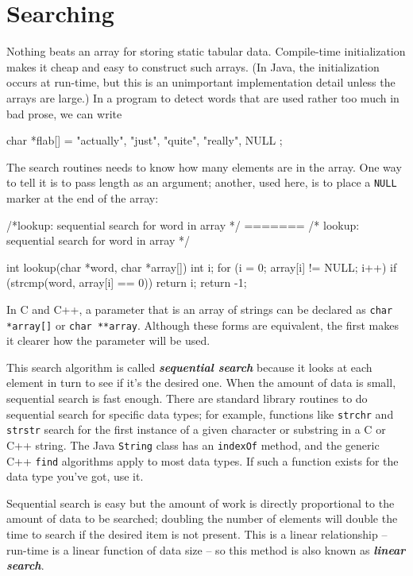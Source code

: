 \section{Searching}
Nothing beats an array for storing static tabular data. Compile-time
initialization makes it cheap and easy to construct such arrays. (In Java,
the initialization occurs at run-time, but this is an unimportant
implementation detail unless the arrays are large.) In a program to detect
words that are used rather too much in bad prose, we can write
\begin{wellcode}

    char *flab[] = {
        "actually",
        "just",
        "quite",
        "really",
        NULL
    };
\end{wellcode}
The search routines needs to know how many elements are in the array. One way to tell it is to pass length as an argument; another, used here, is to place a \verb'NULL' marker at the end of the array:
\begin{wellcode}
    /*lookup: sequential search for word in array */
=======
    /* lookup: sequential search for word in array */

    int lookup(char *word, char *array[])
    {
        int i;
        for (i = 0; array[i] != NULL; i++)
           if (strcmp(word, array[i] == 0))
                return i;
        return -1;
    }
\end{wellcode}
In C and C++, a parameter that is an array of strings can be declared as
\verb"char *array[]" or \verb"char **array". Although these forms are
equivalent, the first makes it clearer how the parameter will be used.

This search algorithm is called \textbf{\textit{sequential search}} because
it looks at each element in turn to see if it's the desired one. When the
amount of data is small, sequential search is fast enough. There are
standard library routines to do sequential search for specific data types;
for example, functions like \texttt{strchr} and \texttt{strstr} search for
the first instance of a given character or substring in a C or C++ string.
The Java \verb'String' class has an \verb'indexOf' method, and the generic
C++ \verb'find' algorithms apply to most data types. If such a function
exists for the data type you've got, use it.

Sequential search is easy but the amount of work is directly proportional
to the amount of data to be searched; doubling the number of elements will
double the time to search if the desired item is not present. This is a
linear relationship -- run-time is a linear function of data size -- so
this method is also known as \textbf{\textit{linear search}}.


